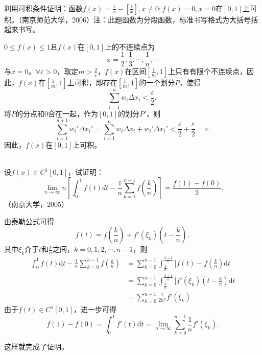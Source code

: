 \begin{example}
  \hfill\\
   利用可积条件证明：函数$f(x)=\frac1x-[\frac1x],x\neq0;f(x)=0,x=0$在$[0,1]$上可积。（南京师范大学，2006）注：此题函数为分段函数，标准书写格式为大括号括起来书写。
   
     $0\leq f(x)\leq1$且$f(x)$在$[0,1]$上的不连续点为$$x=\frac{1}{2},\frac{1}{3},\cdots,\frac{1}{n},\cdots$$与$x=0$。$\forall\varepsilon>0$，取定$m>\frac{2}{\varepsilon}$，$f(x)$在区间$[\frac{1}{m},1]$上只有有限个不连续点，因此，$f(x)$在$[\frac{1}{m},1]$上可积，即存在$[\frac{1}{m},1]$的一个划分$P$，使得
  $$\sum_{i=1}^nw_i\Delta x_i<\frac{\varepsilon}{2},$$
  将$P$的分点和$0$合在一起，作为$[0,1]$的划分$P'$，则
  $$\sum_{i=1}^{n+1}w_i'\Delta x_i'=\sum_{i=1}^nw_i\Delta x_i+w_i'\Delta x_i'<\frac{\varepsilon}{2}+\frac{\varepsilon}{2}=\varepsilon.$$
  因此，$f(x)$在$[0,1]$上可积。
\end{example}
\begin{example}
\hfill\\
 设$f(x)\in C^1[0,1]$，试证明：$$\displaystyle\lim_{n\rightarrow\infty}n[\int_0^1f(t)dt-\frac1n\sum_{k=1}^{n-1}f(\frac kn)]=\frac{f(1)-f(0)}2.$$（南京大学，2005）
 
 由泰勒公式可得
$$f(t)=f(\frac{k}{n})+f'(\xi_k)(t-\frac{k}{n}),$$
其中$\xi_k$介于$t$和$\frac{k}{n}$之间，$k=0,1,2,\cdots,n-1$，则
\begin{align*}
\int_0^1f(t)\mathrm{d}t-\frac{1}{n}\sum_{k=0}^{n-1}f(\frac{k}{n})
&=\sum_{k=0}^{n-1}\int_{\frac{k}{n}}^{\frac{k+1}{n}}[f(t)-f(\frac{k}{n})\mathrm{d}t\\
&=\sum_{k=0}^{n-1}\int_{\frac{k}{n}}^{\frac{k+1}{n}}[f'(\xi_k)(t-\frac{k}{n})\mathrm{d}t\\
&=\sum_{k=0}^{n-1}\frac{1}{2n^2}f'(\xi_k)
\end{align*}
由于$f(t)\in C^1[0,1]$，进一步可得
$$f(1)-f(0)=\int_0^1f'(t)\mathrm{d}t=\lim_{n\rightarrow\infty}\sum_{k=0}^{n-1}\frac{1}{n}f'(\xi_k).$$

这样就完成了证明。
\end{example}
